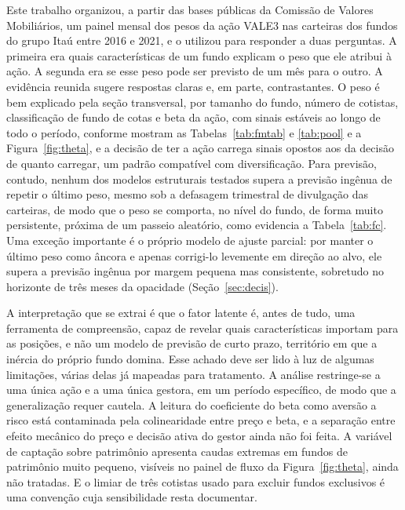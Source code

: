 \documentclass[12pt,a4paper]{article}
\begin{document}
Este trabalho organizou, a partir das bases públicas da Comissão de Valores Mobiliários, um painel
mensal dos pesos da ação VALE3 nas carteiras dos fundos do grupo Itaú entre 2016 e 2021, e o
utilizou para responder a duas perguntas. A primeira era quais características de um fundo explicam
o peso que ele atribui à ação. A segunda era se esse peso pode ser previsto de um mês para o
outro. A evidência reunida sugere respostas claras e, em parte, contrastantes. O peso é bem
explicado pela seção transversal, por tamanho do fundo, número de cotistas, classificação de fundo
de cotas e beta da ação, com sinais estáveis ao longo de todo o período, conforme mostram as
Tabelas~\ref{tab:fmtab} e \ref{tab:pool} e a Figura~\ref{fig:theta}, e a decisão de ter a ação
carrega sinais opostos aos da decisão de quanto carregar, um padrão compatível com diversificação.
Para previsão, contudo, nenhum dos modelos estruturais testados supera a previsão ingênua de
repetir o último peso, mesmo sob a defasagem trimestral de divulgação das carteiras, de modo que o
peso se comporta, no nível do fundo, de forma muito persistente, próxima de um passeio aleatório,
como evidencia a Tabela~\ref{tab:fc}. Uma exceção importante é o próprio modelo de ajuste parcial:
por manter o último peso como âncora e apenas corrigi-lo levemente em direção ao alvo, ele supera a
previsão ingênua por margem pequena mas consistente, sobretudo no horizonte de três meses da
opacidade (Seção~\ref{sec:decis}).

A interpretação que se extrai é que o fator latente é, antes de tudo, uma ferramenta de
compreensão, capaz de revelar quais características importam para as posições, e não um modelo de
previsão de curto prazo, território em que a inércia do próprio fundo domina. Esse achado deve ser
lido à luz de algumas limitações, várias delas já mapeadas para tratamento. A análise restringe-se
a uma única ação e a uma única gestora, em um período específico, de modo que a generalização
requer cautela. A leitura do coeficiente do beta como aversão a risco está contaminada pela
colinearidade entre preço e beta, e a separação entre efeito mecânico do preço e decisão ativa do
gestor ainda não foi feita. A variável de captação sobre patrimônio apresenta caudas extremas em
fundos de patrimônio muito pequeno, visíveis no painel de fluxo da Figura~\ref{fig:theta}, ainda
não tratadas. E o limiar de três cotistas usado para excluir fundos exclusivos é uma convenção
cuja sensibilidade resta documentar.
\end{document}
